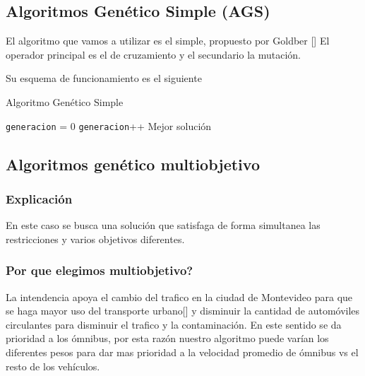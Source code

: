 \subsection{Algoritmos Genético Simple (AGS)}

El algoritmo que vamos a utilizar es el simple, propuesto por Goldber [] 
El operador principal es el de cruzamiento y el secundario la mutación.

Su esquema de funcionamiento es el siguiente


\begin{algorithm}%
	\caption{Algoritmo Genético Simple}
	\label{alg:algoritmo_genetico_simple}
	\begin{algorithmic} [1] 
		{
			\STATE \texttt{generacion} = 0
			\STATE \texttt{generacion}++
			\ENDWHILE
			\RETURN Mejor solución
		}
	\end{algorithmic}
\end{algorithm}




\subsection{Algoritmos genético multiobjetivo}


\subsubsection{Explicación}
En este caso se busca una solución que satisfaga de forma simultanea las restricciones y varios objetivos diferentes.

\subsubsection{Por que elegimos multiobjetivo?}
La intendencia apoya el cambio del trafico en la ciudad de Montevideo para que se haga mayor uso del transporte urbano[] y disminuir la cantidad de automóviles circulantes para disminuir el trafico y la contaminación. En este sentido se da prioridad a los ómnibus, por esta razón nuestro algoritmo puede varían los diferentes pesos para dar mas prioridad a la velocidad promedio de ómnibus vs el resto de los vehículos.
 
